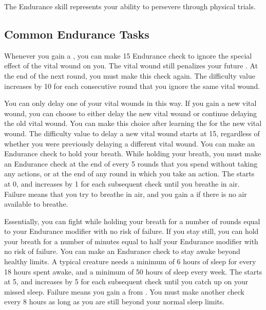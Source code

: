 \newpage
{}
    The Endurance skill represents your ability to persevere through physical trials.

    \subsection{Common Endurance Tasks}
        \label{Delay Vital Wound}
        Whenever you gain a , you can make  15 Endurance check to  ignore the special effect of the vital wound on you.
        The vital wound still penalizes your future .
        At the end of the next round, you must make this check again.
        The difficulty value increases by 10 for each consecutive round that you ignore the same vital wound.

        You can only delay one of your vital wounds in this way.
        If you gain a new vital wound, you can choose to either delay the new vital wound or continue delaying the old vital wound.
        You can make this choice after learning the  for the new vital wound.
        The difficulty value to delay a new vital wound starts at 15, regardless of whether you were previously delaying a different vital wound.
        \label{Hold Breath}
        You can make an Endurance check to hold your breath.
        While holding your breath, you must make an Endurance check at the end of every 5 rounds that you spend without taking any actions, or at the end of any round in which you take an action.
        The  starts at 0, and increases by 1 for each subsequent check until you breathe in air.
        Failure means that you try to breathe in air, and you gain a  if there is no air available to breathe.

        Essentially, you can fight while holding your breath for a number of rounds equal to your Endurance modifier with no risk of failure.
        If you stay still, you can hold your breath for a number of minutes equal to half your Endurance modifier with no risk of failure.
         You can make an Endurance check to stay awake beyond healthy limits.
        A typical creature needs a minimum of 6 hours of sleep for every 18 hours spent awake, and a minimum of 50 hours of sleep every week.
        The  starts at 5, and increases by 5 for each subsequent check until you catch up on your missed sleep.
        Failure means you gain a  from .
        You must make another check every 8 hours as long as you are still beyond your normal sleep limits.


